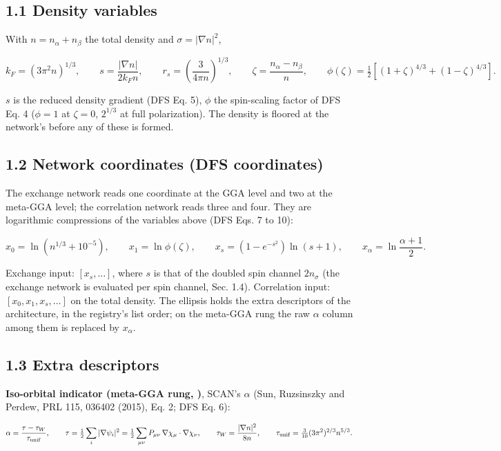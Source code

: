 \documentclass[10pt,a4paper]{article}
\begin{document}
\subsection*{1.1 Density variables}

With $n = n_\alpha + n_\beta$ the total density and $\sigma = |\nabla n|^2$,

\[
k_F = (3\pi^2 n)^{1/3}, \qquad
s = \frac{|\nabla n|}{2 k_F n}, \qquad
r_s = \left(\frac{3}{4\pi n}\right)^{1/3}, \qquad
\zeta = \frac{n_\alpha - n_\beta}{n}, \qquad
\phi(\zeta) = \tfrac12\left[(1+\zeta)^{4/3} + (1-\zeta)^{4/3}\right].
\]

$s$ is the reduced density gradient (DFS Eq. 5), $\phi$ the spin-scaling factor of DFS Eq. 4 ($\phi = 1$ at $\zeta = 0$, $2^{1/3}$ at full polarization). The density is floored at the network's  before any of these is formed.

\subsection*{1.2 Network coordinates (DFS coordinates)}

The exchange network reads one coordinate at the GGA level and two at the meta-GGA level; the correlation network reads three and four. They are logarithmic compressions of the variables above (DFS Eqs. 7 to 10):

\[
x_0 = \ln\!\left(n^{1/3} + 10^{-5}\right), \qquad
x_1 = \ln \phi(\zeta), \qquad
x_s = \left(1 - e^{-s^2}\right)\ln(s + 1), \qquad
x_\alpha = \ln\frac{\alpha + 1}{2}.
\]

Exchange input: $[x_s, \ldots]$, where $s$ is that of the doubled spin channel $2 n_\sigma$ (the exchange network is evaluated per spin channel, Sec. 1.4). Correlation input: $[x_0, x_1, x_s, \ldots]$ on the total density. The ellipsis holds the extra descriptors of the architecture, in the registry's list order; on the meta-GGA rung the raw $\alpha$ column among them is replaced by $x_\alpha$.

\subsection*{1.3 Extra descriptors}

\textbf{Iso-orbital indicator (meta-GGA rung, )}, SCAN's $\alpha$ (Sun, Ruzsinszky and Perdew, PRL 115, 036402 (2015), Eq. 2; DFS Eq. 6):

\[
\alpha = \frac{\tau - \tau_W}{\tau_{\rm unif}}, \qquad
\tau = \tfrac12 \sum_i |\nabla\psi_i|^2 = \tfrac12 \sum_{\mu\nu} P_{\mu\nu}\, \nabla\chi_\mu\cdot\nabla\chi_\nu, \qquad
\tau_W = \frac{|\nabla n|^2}{8n}, \qquad
\tau_{\rm unif} = \tfrac{3}{10}(3\pi^2)^{2/3} n^{5/3}.
\]
\end{document}
